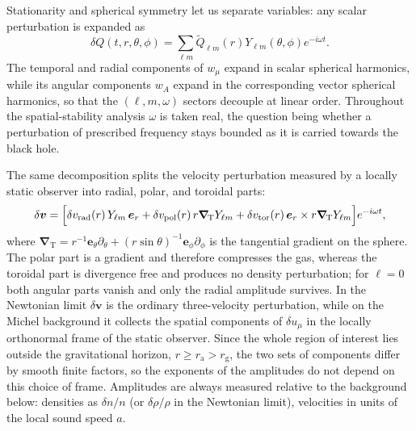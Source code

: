 \documentclass[12pt,a4paper,preprint,nopreprintline]{elsarticle}
\begin{document}
Stationarity and spherical symmetry let us separate variables: any scalar perturbation is expanded as
\begin{equation}
    \delta Q(t,r,\theta,\phi)
    =
    \sum_{\ell m}
    \widetilde{Q}_{\ell m}(r)
    Y_{\ell m}(\theta,\phi)e^{-i\omega t}.
    \label{eq:harmonic_decomposition}
\end{equation}
The temporal and radial components of $w_{\mu}$ expand in scalar spherical harmonics, while its angular components $w_{A}$ expand in the corresponding vector spherical harmonics, so that the $(\ell,m,\omega)$ sectors decouple at linear order. Throughout the spatial-stability analysis $\omega$ is taken real, the question being whether a perturbation of prescribed frequency stays bounded as it is carried towards the black hole.

The same decomposition splits the velocity perturbation measured by a locally static observer into radial, polar, and toroidal parts:
\begin{equation}
    \delta\boldsymbol{v}
    =
    \Bigl[
        \delta v_{\mathrm{rad}}(r)\,Y_{\ell m}\,\boldsymbol{e}_{r}
        +
        \delta v_{\mathrm{pol}}(r)\,
        r\boldsymbol{\nabla}_{\!\mathrm{T}}Y_{\ell m}
        +
        \delta v_{\mathrm{tor}}(r)\,
        \boldsymbol{e}_{r}\times r\boldsymbol{\nabla}_{\!\mathrm{T}}Y_{\ell m}
    \Bigr]e^{-i\omega t},
    \label{eq:velocity_amplitudes}
\end{equation}
where $\boldsymbol{\nabla}_{\!\mathrm{T}}
=r^{-1}\boldsymbol{e}_{\theta}\partial_{\theta}
+(r\sin\theta)^{-1}\boldsymbol{e}_{\phi}\partial_{\phi}$ is the tangential gradient on the sphere. The polar part is a gradient and therefore compresses the gas, whereas the toroidal part is divergence free and produces no density perturbation; for $\ell=0$ both angular parts vanish and only the radial amplitude survives. In the Newtonian limit $\delta\boldsymbol{v}$ is the ordinary three-velocity perturbation, while on the Michel background it collects the spatial components of $\delta u_{\mu}$ in the locally orthonormal frame of the static observer. Since the whole region of interest lies outside the gravitational horizon, $r\geq r_{\mathrm{a}}>r_{\mathrm{g}}$, the two sets of components differ by smooth finite factors, so the exponents of the amplitudes do not depend on this choice of frame. Amplitudes are always measured relative to the background below: densities as $\delta n/n$ (or $\delta\rho/\rho$ in the Newtonian limit), velocities in units of the local sound speed $a$.
\end{document}
